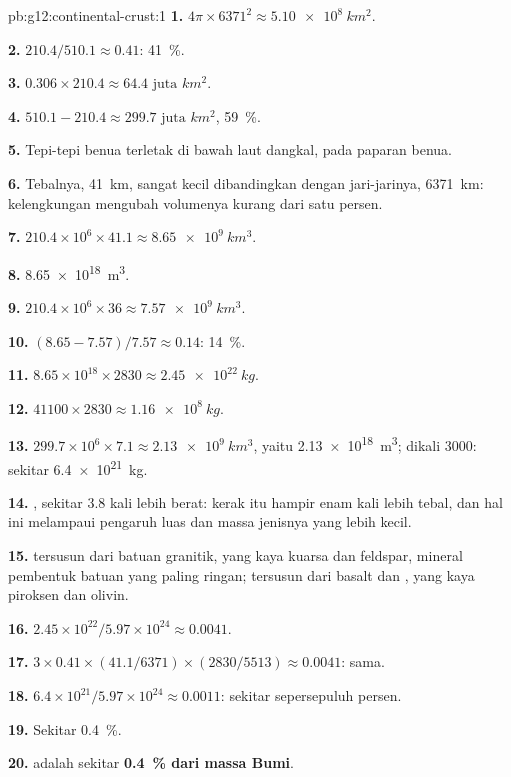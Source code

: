 \begin{solution}{pb:g12:continental-crust:1}
\textbf{1.} $4\pi \times 6371^2 \approx \qty{5.10e8}{km^2}$.

\textbf{2.} $210.4/510.1 \approx 0.41$: \qty{41}{\percent}.

\textbf{3.} $0.306 \times 210.4 \approx \num{64.4}\text{ juta }\unit{km^2}$.

\textbf{4.} $510.1 - 210.4 \approx \num{299.7}\text{ juta }\unit{km^2}$,
\qty{59}{\percent}.

\textbf{5.} Tepi-tepi benua terletak di bawah laut dangkal, pada paparan
benua.

\textbf{6.} Tebalnya, \qty{41}{km}, sangat kecil dibandingkan dengan
jari-jarinya, \qty{6371}{km}: kelengkungan mengubah volumenya kurang dari satu
persen.

\textbf{7.} $210.4 \times 10^6 \times 41.1 \approx \qty{8.65e9}{km^3}$.

\textbf{8.} \qty{8.65e18}{m^3}.

\textbf{9.} $210.4 \times 10^6 \times 36 \approx \qty{7.57e9}{km^3}$.

\textbf{10.} $(8.65 - 7.57)/7.57 \approx 0.14$: \qty{14}{\percent}.

\textbf{11.} $8.65 \times 10^{18} \times 2830 \approx \qty{2.45e22}{kg}$.

\textbf{12.} $41100 \times 2830 \approx \qty{1.16e8}{kg}$.

\textbf{13.} $299.7 \times 10^6 \times 7.1 \approx \qty{2.13e9}{km^3}$, yaitu
\qty{2.13e18}{m^3}; dikali 3000: sekitar \qty{6.4e21}{kg}.

\textbf{14.} , sekitar 3.8 kali lebih berat: kerak itu hampir enam
kali lebih tebal, dan hal ini melampaui pengaruh luas dan massa jenisnya yang
lebih kecil.

\textbf{15.}  tersusun dari batuan granitik, yang kaya kuarsa dan
feldspar, mineral pembentuk batuan yang paling ringan;  tersusun
dari basalt dan , yang kaya piroksen dan olivin.

\textbf{16.} $2.45 \times 10^{22}/5.97 \times 10^{24} \approx 0.0041$.

\textbf{17.} $3 \times 0.41 \times (41.1/6371) \times (2830/5513) \approx
0.0041$: sama.

\textbf{18.} $6.4 \times 10^{21}/5.97 \times 10^{24} \approx 0.0011$: sekitar
sepersepuluh persen.

\textbf{19.} Sekitar \qty{0.4}{\percent}.

\textbf{20.}  adalah sekitar \textbf{\qty{0.4}{\percent} dari massa
Bumi}.
\end{solution}
